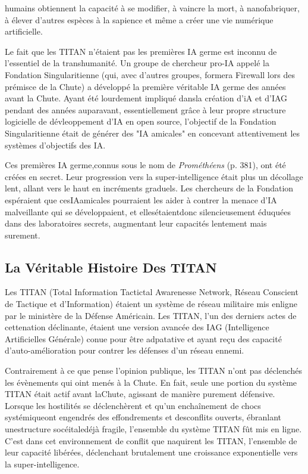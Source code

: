 humains obtiennent la capacité à se modifier, à vaincre la mort, à nanofabriquer, à élever d'autres espèces à la sapience et même a créer une vie numérique artificielle. 

Le fait que les TITAN n'étaient pas les premières IA germe est inconnu de l'essentiel de la transhumanité. Un groupe de chercheur pro-IA appelé la Fondation Singularitienne (qui, avec d'autres groupes, formera Firewall lors des prémisce de la Chute) a développé la première véritable IA germe des années avant la Chute. Ayant été lourdement impliqué dansla création d'iA et d'IAG pendant des années auparavant, essentiellement grâce à leur propre structure logicielle de dévleoppement d'IA en open source, l'objectif de la  Fondation Singularitienne était de générer des "IA amicales" en concevant attentivement les systèmes d'objectifs des IA. 

Ces premières IA germe,connus sous le nom de \textit{Prométhéens} (p. 381), ont été créées en secret. Leur progression vers la super-intelligence était plus un décollage lent, allant vers le haut en incréments graduels. Les chercheurs de la Fondation espéraient que cesIAamicales pourraient les aider à contrer la menace d'IA malveillante qui se développaient, et ellesétaientdonc silencieusement éduquées dans des laboratoires secrets, augmentant leur capacités lentement mais surement. 

\subsection{La Véritable Histoire Des TITAN} 

Les TITAN (Total Information Tactictal Awarenesse Network, Réseau Conscient de Tactique et d'Information) étaient un système de réseau militaire mis enligne par le ministère de la Défense Américain. Les TITAN, l'un des derniers actes de cettenation déclinante, étaient une version avancée des IAG (Intelligence Artificielles Générale) conue pour être adpatative et ayant reçu des capacité d'auto-amélioration pour contrer les défenses d'un réseau ennemi. 

Contrairement à ce que pense l'opinion publique, les TITAN n'ont pas déclenchés les évènements qui oint menés à la Chute. En fait, seule une portion du système TITAN était actif avant laChute, agissant de manière purement défensive. Lorsque les hostilités se déclenchèrent et qu'un enchaînement de chocs systémiqueont engendrés des effondrements et desconflits ouverts, ébranlant unestructure socéitaledéjà fragile, l'ensemble du système TITAN fût mis en ligne. C'est dans cet environnement de conflit que naquirent les TITAN, l'ensemble de leur capacité libérées, déclenchant brutalement une croissance exponentielle vers la super-intelligence. 

